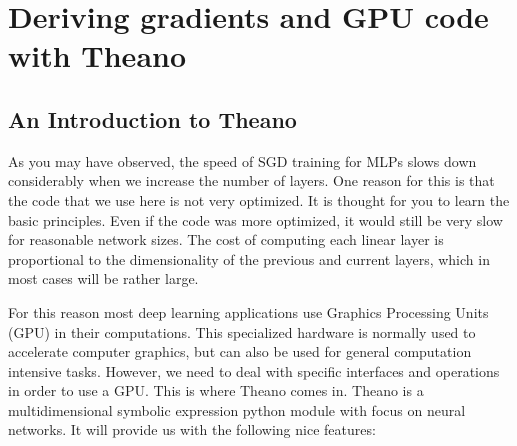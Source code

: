 
%
%
%

\section{Deriving gradients and GPU code with Theano}

\subsection{An Introduction to Theano}

As you may have observed, the speed of SGD training for MLPs slows down
considerably when we increase the number of layers. One reason for this is that
the code that we use here is not very optimized. It is thought for you to
learn the basic principles. Even if the code was more optimized, it would still be
very slow for reasonable network sizes. The cost of computing each
linear layer is proportional to the dimensionality of the previous and current
layers, which in most cases will be rather large. 

For this reason most deep learning applications use Graphics Processing Units
(GPU) in their computations. This specialized hardware is normally used to
accelerate computer graphics, but can also be used for general computation
intensive tasks. However, we need to deal with specific interfaces and
operations in order to use a GPU. This is where Theano comes in. Theano is a
multidimensional symbolic expression python module with focus on neural
networks. It will provide us with the following nice features:

